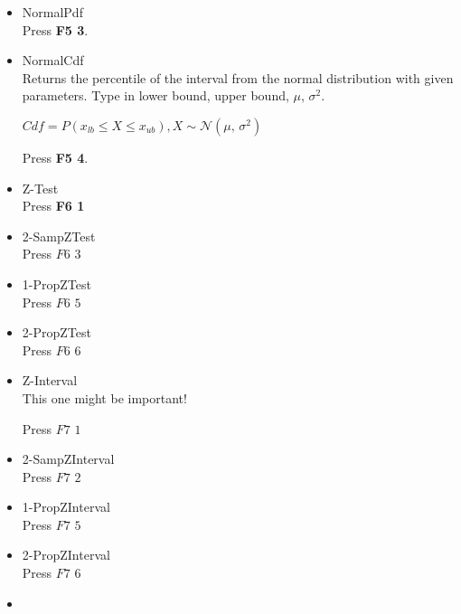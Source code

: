     \begin{itemize}
        \item NormalPdf\\
        
        Press \textbf{F5 3}.

        \item NormalCdf\\
        Returns the percentile of the interval from the normal distribution with given parameters. Type in lower bound, upper bound, $\mu$, $\sigma^{2}$.
        \begin{center}
            $Cdf = P(x_{lb}\leq X \leq x_{ub}),  X\sim \mathcal{N}(\mu,\,\sigma^{2})$
            \label{NormalCdf}
        \end{center}

        Press \textbf{F5 4}.

        \item Z-Test\\

        Press \textbf{F6 1}

        \item 2-SampZTest\\

        Press $F6$ $3$

        \item 1-PropZTest\\

        Press $F6$ $5$

        \item 2-PropZTest\\

        Press $F6$ 6

        \item Z-Interval\\
        This one might be important!

        Press $F7$ $1$

        \item 2-SampZInterval\\

        Press $F7$ $2$

        \item 1-PropZInterval\\

        Press $F7$ $5$

        \item 2-PropZInterval\\

        Press $F7$ $6$

        \item
        
    \end{itemize}

